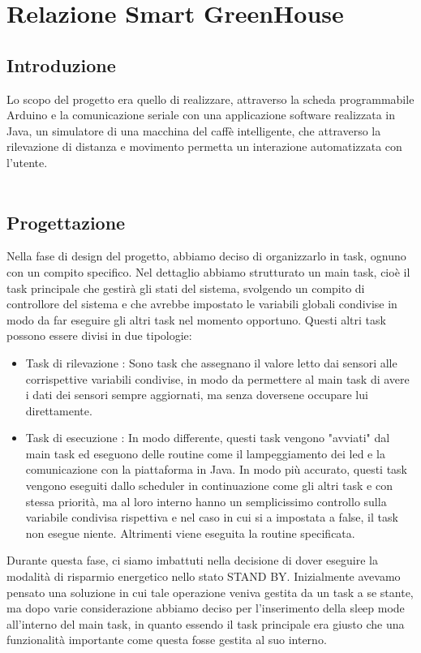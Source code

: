\documentclass[a4paper]{article}
\begin{document}
\section*{Relazione Smart GreenHouse} 
\subsection*{Introduzione}
Lo scopo del progetto era quello di realizzare, attraverso la scheda programmabile Arduino e la comunicazione seriale con una applicazione software realizzata in Java, un simulatore di una macchina del caffè intelligente, che attraverso la rilevazione di distanza e movimento permetta un interazione automatizzata con l'utente.
\\
\\
\subsection*{Progettazione}
Nella fase di design del progetto, abbiamo deciso di organizzarlo in task, ognuno con un compito specifico. Nel dettaglio abbiamo strutturato un main task, cioè il task principale che gestirà gli stati del sistema, svolgendo un compito di controllore del sistema e che avrebbe impostato le variabili globali condivise in modo da far eseguire gli altri task nel momento opportuno.
Questi altri task possono essere divisi in due tipologie:
\begin{itemize}
\item {Task di rilevazione }:
Sono task che assegnano il valore letto dai sensori alle corrispettive variabili condivise, in modo da permettere al main task di avere i dati dei sensori sempre aggiornati, ma senza doversene occupare lui direttamente.


\item {Task di esecuzione }:
In modo differente, questi task vengono "avviati" dal main task ed eseguono delle routine come il lampeggiamento dei led e la comunicazione con la piattaforma in Java.
In modo più accurato, questi task vengono eseguiti dallo scheduler in continuazione come gli altri task e con stessa priorità, ma al loro interno hanno un semplicissimo controllo sulla variabile condivisa rispettiva e nel caso in cui si
a impostata a false, il task non esegue niente. Altrimenti viene eseguita la routine specificata.

\end{itemize}
Durante questa fase, ci siamo imbattuti nella decisione di dover eseguire la modalità di risparmio energetico nello stato STAND BY. Inizialmente avevamo pensato una soluzione in cui tale operazione veniva gestita da un task a se stante, ma dopo varie considerazione abbiamo deciso per l'inserimento della sleep mode all'interno del main task, in quanto essendo il task principale era giusto che una funzionalità importante come questa fosse gestita al suo interno. 
\end{document}
